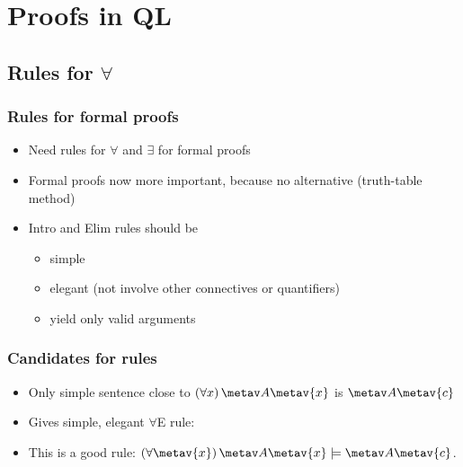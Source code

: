 ﻿%

\setcounter{section}{6}

\section{Proofs in QL}

\subsection{Rules for $\forall$}

\begin{frame}
\frametitle{Rules for formal proofs}

\begin{itemize}[<+->]
\item Need rules for $\forall$ and $\exists$ for formal proofs
\item Formal proofs now more important, because no alternative
  (truth-table method)
\item Intro and Elim rules should be
\begin{itemize}[<+->]
\item simple
\item elegant (not involve other connectives or quantifiers)
\item yield only valid arguments
\end{itemize}
\end{itemize}

\end{frame}

\begin{frame}
\frametitle{Candidates for rules}

\begin{itemize}[<+->]
\item Only simple sentence close to $\qt{\forall}{x}\, \metav A\qv{\metav{x}}$ is
$\metav A\qv{\metav{c}}$
\item Gives simple, elegant $\forall$E rule:

\begin{fitchproof}
\end{fitchproof}
\item This is a good rule: $\qt{\forall}{\metav{x}}\,\metav A\qv{\metav{x}}
\models \metav A\qv{\metav{c}}$.
\end{itemize}
\end{frame}

